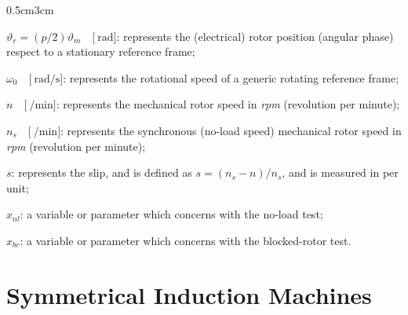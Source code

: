 \documentclass[12pt,a4paper]{scrartcl}
\newenvironment{myitemize_2}
{ \begin{itemize}[topsep=2pt]
		\setlength{\topsep}{4pt}
		\setlength{\itemsep}{4pt}
		\setlength{\parskip}{4pt}
		\setlength{\parsep}{4pt}     }
	{ \end{itemize}                  }
\begin{document}
\begin{onehalfspace}
\begin{changemargin}{0.5cm}{3cm}
\begin{myitemize_2}
	\item[--] $\vartheta_r=(p/2)\vartheta_m\quad\Big[\SI{}{\radian}\Big]$: represents the (electrical) rotor position (angular phase) respect to a stationary reference frame;
	\item[--] $\omega_0\quad\Big[\SI{}{\radian\per\second}\Big]$: represents the rotational speed of a generic rotating reference frame;
	\item[--] $n\quad\Big[\SI{}{\per\minute}\Big]$: represents the mechanical rotor speed in \textit{rpm} (revolution per minute);
	\item[--] $n_s\quad\Big[\SI{}{\per\minute}\Big]$: represents the synchronous (no-load speed) mechanical rotor speed in \textit{rpm} (revolution per minute);
	\item[--] $s$: represents the slip, and is defined as $s=(n_s - n)/n_s$, and is measured in per unit;
	\item[--] $x_{nl}$: a variable or parameter which concerns with the no-load test;
	\item[--] $x_{br}$: a variable or parameter which concerns with the blocked-rotor test.
\end{myitemize_2}
\end{changemargin}



\section{Symmetrical Induction Machines}

\end{onehalfspace}
\end{document}
